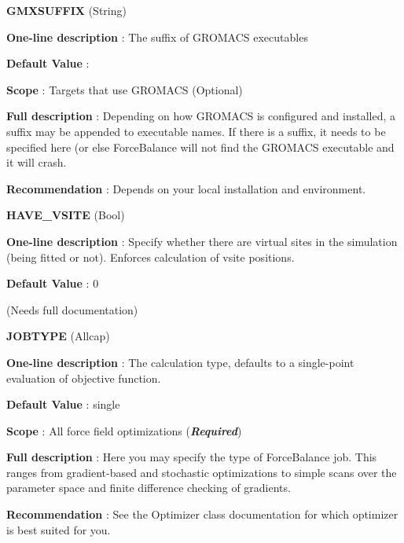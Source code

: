 \begin{DoxyItemize}
\item {\bfseries  G\-M\-X\-S\-U\-F\-F\-I\-X } (String) \par
{\bfseries  One-\/line description }\-: The suffix of G\-R\-O\-M\-A\-C\-S executables \par
{\bfseries  Default Value }\-: \par
{\bfseries  Scope }\-: Targets that use G\-R\-O\-M\-A\-C\-S (Optional) \par
{\bfseries  Full description }\-: Depending on how G\-R\-O\-M\-A\-C\-S is configured and installed, a suffix may be appended to executable names. If there is a suffix, it needs to be specified here (or else Force\-Balance will not find the G\-R\-O\-M\-A\-C\-S executable and it will crash. \par
{\bfseries  Recommendation }\-: Depends on your local installation and environment.\end{DoxyItemize}
\begin{DoxyItemize}
\item {\bfseries  H\-A\-V\-E\-\_\-\-V\-S\-I\-T\-E } (Bool) \par
{\bfseries  One-\/line description }\-: Specify whether there are virtual sites in the simulation (being fitted or not). Enforces calculation of vsite positions. \par
{\bfseries  Default Value }\-: 0 \par
(Needs full documentation)\end{DoxyItemize}
\begin{DoxyItemize}
\item {\bfseries  J\-O\-B\-T\-Y\-P\-E } (Allcap) \par
{\bfseries  One-\/line description }\-: The calculation type, defaults to a single-\/point evaluation of objective function. \par
{\bfseries  Default Value }\-: single \par
{\bfseries  Scope }\-: All force field optimizations ({\bfseries {\itshape Required}}) \par
{\bfseries  Full description }\-: Here you may specify the type of Force\-Balance job. This ranges from gradient-\/based and stochastic optimizations to simple scans over the parameter space and finite difference checking of gradients. \par
{\bfseries  Recommendation }\-: See the Optimizer class documentation for which optimizer is best suited for you.\end{DoxyItemize}
